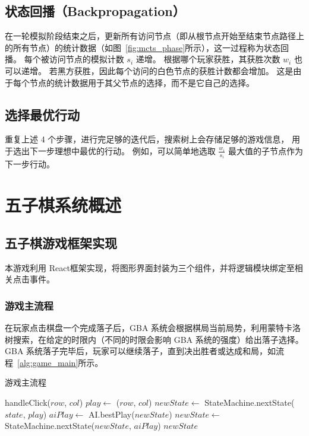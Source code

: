 \documentclass[UTF8,cs4size]{ctexart}
\begin{document}
\subsection{状态回播（Backpropagation）}
在一轮模拟阶段结束之后，更新所有访问节点（即从根节点开始至结束节点路径上的所有节点）的统计数据（如图~\ref{fig:mcts_phase}所示），这一过程称为状态回播。
每个被访问节点的模拟计数 $s_i$ 递增。
根据哪个玩家获胜，其获胜次数 $w_i$ 也可以递增。
若黑方获胜，因此每个访问的白色节点的获胜计数都会增加。
这是由于每个节点的统计数据用于其父节点的选择，而不是它自己的选择。

\subsection{选择最优行动}
重复上述 4 个步骤，进行完足够的迭代后，搜索树上会存储足够的游戏信息，
用于选出下一步理想中最优的行动。
例如，可以简单地选取 $\frac{w_i}{s_i}$ 最大值的子节点作为下一步行动。

\clearpage

\section{五子棋系统概述}
\subsection{五子棋游戏框架实现}
本游戏利用 React\cite{web:react}框架实现，将图形界面封装为三个组件，并将逻辑模块绑定至相关点击事件。
\subsubsection{游戏主流程}
在玩家点击棋盘一个完成落子后，GBA 系统会根据棋局当前局势，利用蒙特卡洛树搜索，在给定的时限内（不同的时限会影响 GBA 系统的强度）给出落子选择。
GBA 系统落子完毕后，玩家可以继续落子，直到决出胜者或达成和局，如流程~\ref{alg:game_main}所示。

\begin{algorithm}
	\algrenewcommand{}
	\algrenewcommand{}
	\caption{游戏主流程}
	\label{alg:game_main}
  \begin{algorithmic}[1]
      \State handleClick($row$, $col$)
      \State $play \gets$ ($row$, $col$)
      \State $newState \gets$ StateMachine.nextState($state$, $play$)
      \State $aiPlay \gets$ AI.bestPlay($newState$)
      \State $newState \gets$ StateMachine.nextState($newState$, $aiPlay$)
    \EndWhile
    \Return $newState$
	\end{algorithmic}  
\end{algorithm}
\end{document}
